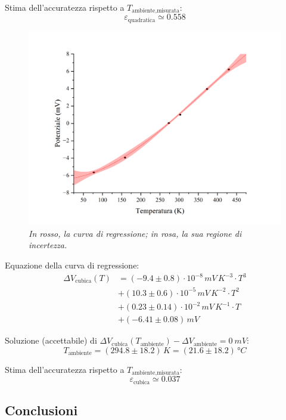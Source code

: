 \documentclass{article}
\begin{document}
Stima dell'accuratezza rispetto a $T_\text{ambiente,misurata}$:
\[ \varepsilon_\text{quadratica} \simeq 0.558 \]

\pagebreak
\begin{figure}[H]
  \centering
  \includegraphics[trim={2cm 0.6cm 3cm 1cm},clip,width=\textwidth]{img/regressione3.png}
  \caption*{\emph{
    In rosso, la curva di regressione; in rosa, la sua regione di incertezza.
  }}
\end{figure}

Equazione della curva di regressione:
\[\begin{aligned}\Delta V_\text{cubica}(T)
  &= (-9.4\pm0.8)\cdot10^{-8}\,\unit{mV\,K^{-3}}\cdot T^3 \\
  &+ (10.3\pm0.6)\cdot10^{-5}\,\unit{mV\,K^{-2}}\cdot T^2 \\
  &+ (0.23\pm0.14)\cdot10^{-2}\,\unit{mV\,K^{-1}}\cdot T \\
  &+ (-6.41\pm0.08)\,\unit{mV}
\end{aligned}\]

Soluzione (accettabile) di $
  \Delta V_\text{cubica}(T_\text{ambiente}) -
  \Delta V_\text{ambiente} = \qty{0}{mV}$:
\[T_\text{ambiente}
  = (294.8\pm18.2)\,\unit{K}
  = (21.6\pm18.2)\,\unit{\degree C}
\]

Stima dell'accuratezza rispetto a $T_\text{ambiente,misurata}$:
\[ \varepsilon_\text{cubica} \simeq 0.037 \]

\pagebreak
\subsection{Conclusioni}
\end{document}

